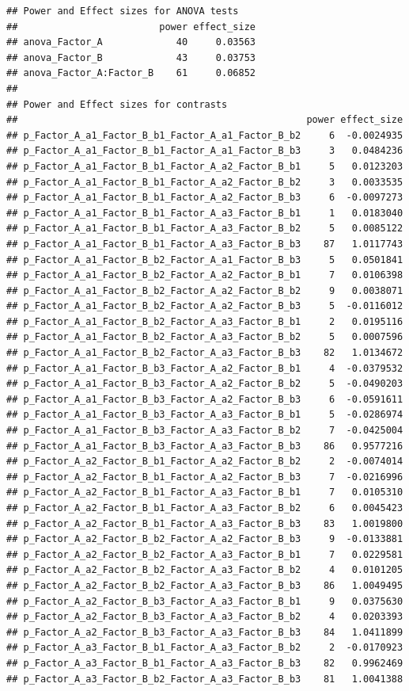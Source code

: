 \documentclass[]{book}
\begin{document}
\begin{verbatim}
## Power and Effect sizes for ANOVA tests
##                         power effect_size
## anova_Factor_A             40     0.03563
## anova_Factor_B             43     0.03753
## anova_Factor_A:Factor_B    61     0.06852
## 
## Power and Effect sizes for contrasts
##                                                   power effect_size
## p_Factor_A_a1_Factor_B_b1_Factor_A_a1_Factor_B_b2     6  -0.0024935
## p_Factor_A_a1_Factor_B_b1_Factor_A_a1_Factor_B_b3     3   0.0484236
## p_Factor_A_a1_Factor_B_b1_Factor_A_a2_Factor_B_b1     5   0.0123203
## p_Factor_A_a1_Factor_B_b1_Factor_A_a2_Factor_B_b2     3   0.0033535
## p_Factor_A_a1_Factor_B_b1_Factor_A_a2_Factor_B_b3     6  -0.0097273
## p_Factor_A_a1_Factor_B_b1_Factor_A_a3_Factor_B_b1     1   0.0183040
## p_Factor_A_a1_Factor_B_b1_Factor_A_a3_Factor_B_b2     5   0.0085122
## p_Factor_A_a1_Factor_B_b1_Factor_A_a3_Factor_B_b3    87   1.0117743
## p_Factor_A_a1_Factor_B_b2_Factor_A_a1_Factor_B_b3     5   0.0501841
## p_Factor_A_a1_Factor_B_b2_Factor_A_a2_Factor_B_b1     7   0.0106398
## p_Factor_A_a1_Factor_B_b2_Factor_A_a2_Factor_B_b2     9   0.0038071
## p_Factor_A_a1_Factor_B_b2_Factor_A_a2_Factor_B_b3     5  -0.0116012
## p_Factor_A_a1_Factor_B_b2_Factor_A_a3_Factor_B_b1     2   0.0195116
## p_Factor_A_a1_Factor_B_b2_Factor_A_a3_Factor_B_b2     5   0.0007596
## p_Factor_A_a1_Factor_B_b2_Factor_A_a3_Factor_B_b3    82   1.0134672
## p_Factor_A_a1_Factor_B_b3_Factor_A_a2_Factor_B_b1     4  -0.0379532
## p_Factor_A_a1_Factor_B_b3_Factor_A_a2_Factor_B_b2     5  -0.0490203
## p_Factor_A_a1_Factor_B_b3_Factor_A_a2_Factor_B_b3     6  -0.0591611
## p_Factor_A_a1_Factor_B_b3_Factor_A_a3_Factor_B_b1     5  -0.0286974
## p_Factor_A_a1_Factor_B_b3_Factor_A_a3_Factor_B_b2     7  -0.0425004
## p_Factor_A_a1_Factor_B_b3_Factor_A_a3_Factor_B_b3    86   0.9577216
## p_Factor_A_a2_Factor_B_b1_Factor_A_a2_Factor_B_b2     2  -0.0074014
## p_Factor_A_a2_Factor_B_b1_Factor_A_a2_Factor_B_b3     7  -0.0216996
## p_Factor_A_a2_Factor_B_b1_Factor_A_a3_Factor_B_b1     7   0.0105310
## p_Factor_A_a2_Factor_B_b1_Factor_A_a3_Factor_B_b2     6   0.0045423
## p_Factor_A_a2_Factor_B_b1_Factor_A_a3_Factor_B_b3    83   1.0019800
## p_Factor_A_a2_Factor_B_b2_Factor_A_a2_Factor_B_b3     9  -0.0133881
## p_Factor_A_a2_Factor_B_b2_Factor_A_a3_Factor_B_b1     7   0.0229581
## p_Factor_A_a2_Factor_B_b2_Factor_A_a3_Factor_B_b2     4   0.0101205
## p_Factor_A_a2_Factor_B_b2_Factor_A_a3_Factor_B_b3    86   1.0049495
## p_Factor_A_a2_Factor_B_b3_Factor_A_a3_Factor_B_b1     9   0.0375630
## p_Factor_A_a2_Factor_B_b3_Factor_A_a3_Factor_B_b2     4   0.0203393
## p_Factor_A_a2_Factor_B_b3_Factor_A_a3_Factor_B_b3    84   1.0411899
## p_Factor_A_a3_Factor_B_b1_Factor_A_a3_Factor_B_b2     2  -0.0170923
## p_Factor_A_a3_Factor_B_b1_Factor_A_a3_Factor_B_b3    82   0.9962469
## p_Factor_A_a3_Factor_B_b2_Factor_A_a3_Factor_B_b3    81   1.0041388
\end{verbatim}
\end{document}
